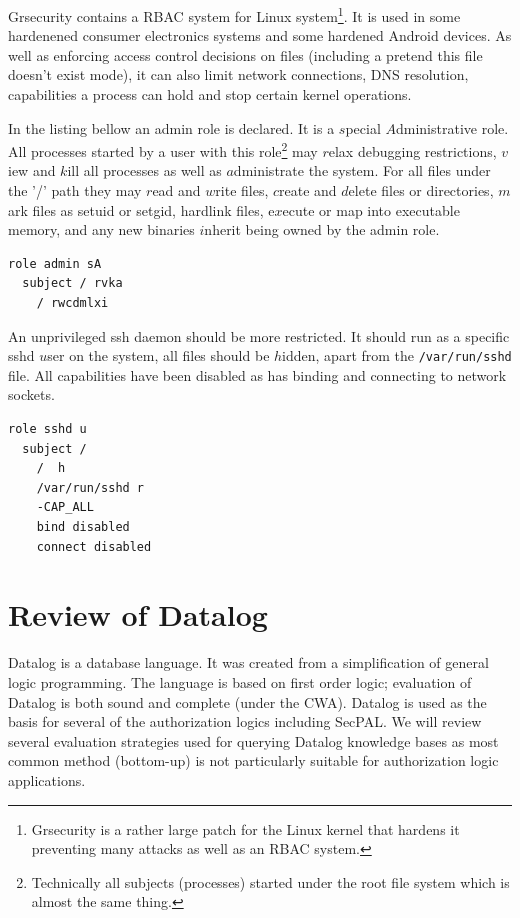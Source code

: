 \documentclass[a4paper]{article}
\begin{document}
Grsecurity contains a \ac{RBAC} system for Linux system\footnote{Grsecurity is
  a rather large patch for the Linux kernel that hardens it preventing many
  attacks as well as an \ac{RBAC} system.}.  It is used in some hardenened consumer
electronics systems and some hardened Android devices.  As well as enforcing
access control decisions on files (including a pretend this file doesn't exist
mode), it can also limit network connections, DNS
resolution, capabilities a process can hold and stop certain kernel operations.

In the listing bellow an admin role is declared.  It is a $s$pecial
$A$dministrative role.  All processes started by a user with this
role\footnote{Technically all subjects (processes) started under the root file
  system which is almost the same thing.} may $r$elax debugging restrictions,
  $v$iew and $k$ill all processes as well as $a$dministrate the system.
For all files under the '/' path they may $r$ead and $w$rite files, $c$reate and
$d$elete files or directories, $m$ark files as setuid or setgid, hardlink files,
e$x$ecute or map into executable memory, and any new binaries $i$nherit being
owned by the admin role.

\begin{lstlisting}[language=grsec]
role admin sA
  subject / rvka 
    / rwcdmlxi
\end{lstlisting}

An unprivileged ssh daemon should be more restricted.  It should run as a
specific sshd $u$ser on the system, all files should be $h$idden, apart from the
\texttt{/var/run/sshd} file.  All capabilities have been disabled as has binding
and connecting to network sockets.

\begin{lstlisting}[language=grsec]
role sshd u
  subject /
    /  h
    /var/run/sshd r
    -CAP_ALL
    bind disabled
    connect disabled
\end{lstlisting}
\section{Review of Datalog}
\label{sec:datalog}

Datalog is a database language. It was created from a simplification of general
logic programming.  The language is based on first order logic; evaluation of
Datalog is both sound and complete (under the \ac{CWA}).  Datalog is used as the
basis for several of the authorization logics including SecPAL. We will review
several evaluation strategies used for querying Datalog knowledge bases as most
common method (bottom-up) is not particularly suitable for authorization logic
applications.
\end{document}
